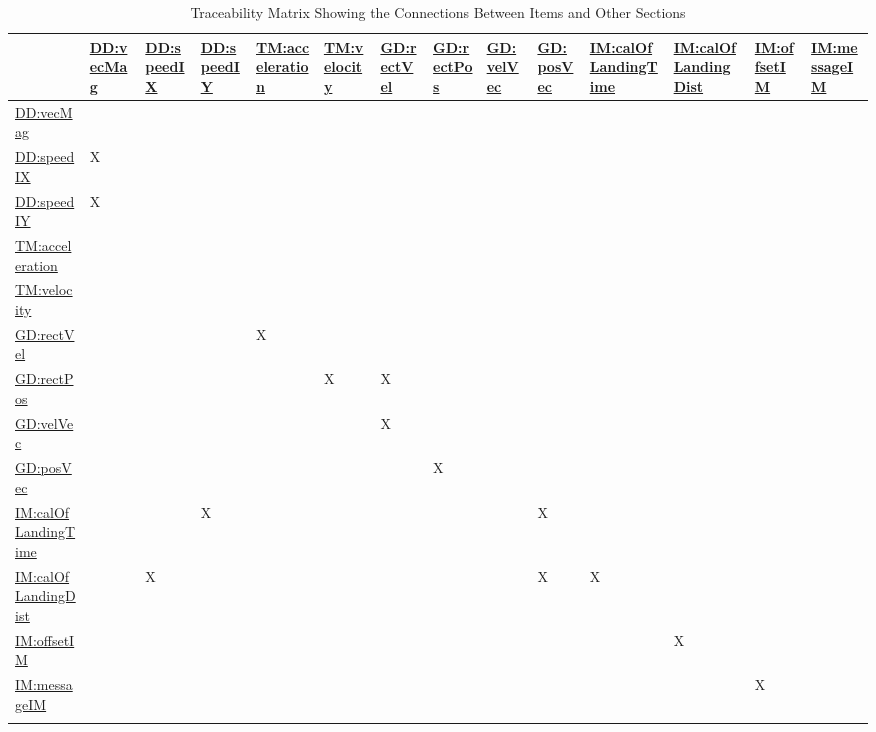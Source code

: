 \documentclass[12pt]{article}
\begin{document}
\begin{longtable}{l l l l l l l l l l l l l l}
\toprule
\textbf{} & \textbf{\hyperref[DD:vecMag]{DD:vecMag}} & \textbf{\hyperref[DD:speedIX]{DD:speedIX}} & \textbf{\hyperref[DD:speedIY]{DD:speedIY}} & \textbf{\hyperref[TM:acceleration]{TM:acceleration}} & \textbf{\hyperref[TM:velocity]{TM:velocity}} & \textbf{\hyperref[GD:rectVel]{GD:rectVel}} & \textbf{\hyperref[GD:rectPos]{GD:rectPos}} & \textbf{\hyperref[GD:velVec]{GD:velVec}} & \textbf{\hyperref[GD:posVec]{GD:posVec}} & \textbf{\hyperref[IM:calOfLandingTime]{IM:calOfLandingTime}} & \textbf{\hyperref[IM:calOfLandingDist]{IM:calOfLandingDist}} & \textbf{\hyperref[IM:offsetIM]{IM:offsetIM}} & \textbf{\hyperref[IM:messageIM]{IM:messageIM}}
\\
\midrule
\endhead
\hyperref[DD:vecMag]{DD:vecMag} &  &  &  &  &  &  &  &  &  &  &  &  & 
\\
\hyperref[DD:speedIX]{DD:speedIX} & X &  &  &  &  &  &  &  &  &  &  &  & 
\\
\hyperref[DD:speedIY]{DD:speedIY} & X &  &  &  &  &  &  &  &  &  &  &  & 
\\
\hyperref[TM:acceleration]{TM:acceleration} &  &  &  &  &  &  &  &  &  &  &  &  & 
\\
\hyperref[TM:velocity]{TM:velocity} &  &  &  &  &  &  &  &  &  &  &  &  & 
\\
\hyperref[GD:rectVel]{GD:rectVel} &  &  &  & X &  &  &  &  &  &  &  &  & 
\\
\hyperref[GD:rectPos]{GD:rectPos} &  &  &  &  & X & X &  &  &  &  &  &  & 
\\
\hyperref[GD:velVec]{GD:velVec} &  &  &  &  &  & X &  &  &  &  &  &  & 
\\
\hyperref[GD:posVec]{GD:posVec} &  &  &  &  &  &  & X &  &  &  &  &  & 
\\
\hyperref[IM:calOfLandingTime]{IM:calOfLandingTime} &  &  & X &  &  &  &  &  & X &  &  &  & 
\\
\hyperref[IM:calOfLandingDist]{IM:calOfLandingDist} &  & X &  &  &  &  &  &  & X & X &  &  & 
\\
\hyperref[IM:offsetIM]{IM:offsetIM} &  &  &  &  &  &  &  &  &  &  & X &  & 
\\
\hyperref[IM:messageIM]{IM:messageIM} &  &  &  &  &  &  &  &  &  &  &  & X & 
\\
\bottomrule
\caption{Traceability Matrix Showing the Connections Between Items and Other Sections}
\label{Table:TraceMatRefvsRef}
\end{longtable}
\end{document}
